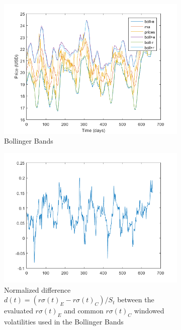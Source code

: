 \documentclass[11pt,a4,twosided,singlespacing,titlepagenumber=on]{scrreprt}
\numberwithin{equation}{chapter} %
\theoremstyle{remark}
\begin{document}
\begin{figure}[H]
\begin{subfigure}[t]{0.49\textwidth}
        \centering
        \includegraphics[width=1\textwidth]{model_vol/5}
        \caption{Bollinger Bands}
        \label{vol_mod_5}
    \end{subfigure}
    \begin{subfigure}[t]{0.49\textwidth}
        \centering
        \includegraphics[width=1\textwidth]{model_vol/6}
        \caption{Normalized difference $d(t) = (r\sigma(t)_E - r\sigma(t)_C) / S_t$ between the evaluated $r\sigma(t)_E$ and common $r\sigma(t)_C$ windowed volatilities used in the Bollinger Bands}
        \label{vol_mod_6}
    \end{subfigure}
    \caption{}
\end{figure}
\end{document}

